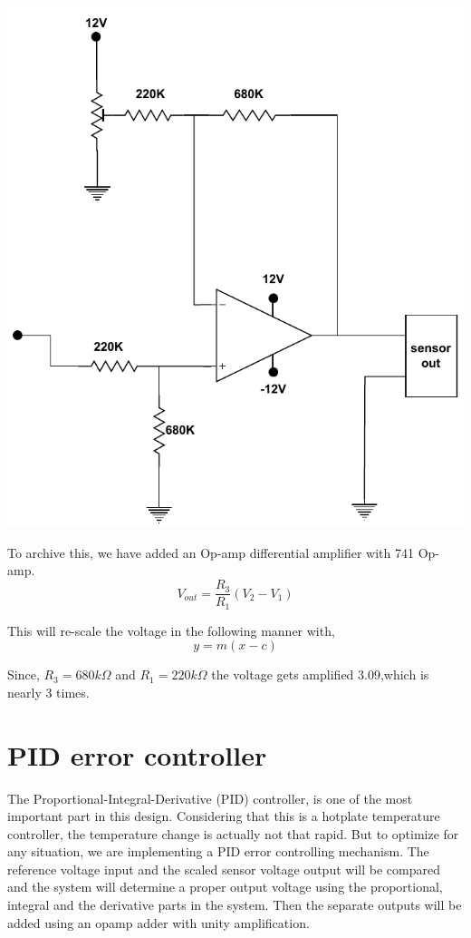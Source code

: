 \begin{multicols}{2}
\begin{minipage}{0.45\textwidth}
\centering
\includegraphics[width=\textwidth]{Method/Scalers.pdf}
\end{minipage}

To archive this, we have added an Op-amp differential amplifier with 741 Op-amp.
$$ V_{out} = \frac{R_3}{R_1}(V_2 - V_1)$$

This will re-scale the voltage in the following manner with,
$$y=m(x-c)$$

Since, $R_3=680k\Omega$ and $R_1=220k\Omega$
the voltage gets amplified 3.09,which is nearly 3 times.

\section{PID error controller}
 The Proportional-Integral-Derivative (PID) controller, is one of the most important part in this design. Considering that this is a hotplate temperature controller, the temperature change is actually not that rapid. But to optimize for any situation, we are implementing a PID error controlling mechanism. The reference voltage input and the scaled sensor voltage output will be compared and the system will determine a proper output voltage using the proportional, integral and the derivative parts in the system. Then the separate outputs will be added using an opamp adder with unity amplification. 


\end{multicols}
